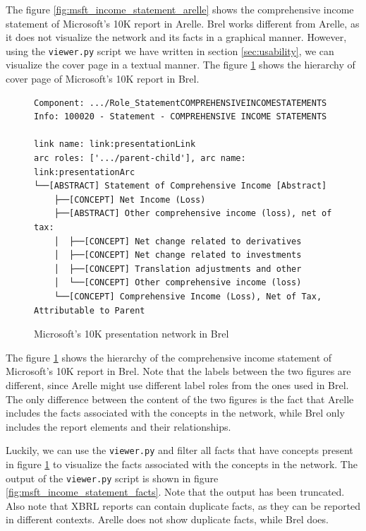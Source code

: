 The figure \ref{fig:msft_income_statement_arelle} shows the comprehensive income statement of Microsoft's 10K report in Arelle.
Brel works different from Arelle, as it does not visualize the network and its facts in a graphical manner.
However, using the \texttt{viewer.py} script we have written in section \ref{sec:usability}, 
we can visualize the cover page in a textual manner.
The figure \ref{fig:msft_income_statement_network} shows the hierarchy of cover page of Microsoft's 10K report in Brel.

\begin{figure}[H]
    \begin{lstlisting}[basicstyle=\scriptsize\ttfamily]
Component: .../Role_StatementCOMPREHENSIVEINCOMESTATEMENTS
Info: 100020 - Statement - COMPREHENSIVE INCOME STATEMENTS

link name: link:presentationLink
arc roles: ['.../parent-child'], arc name: link:presentationArc
└──[ABSTRACT] Statement of Comprehensive Income [Abstract]
    ├──[CONCEPT] Net Income (Loss)
    ├──[ABSTRACT] Other comprehensive income (loss), net of tax:
    │  ├──[CONCEPT] Net change related to derivatives
    │  ├──[CONCEPT] Net change related to investments
    │  ├──[CONCEPT] Translation adjustments and other
    │  └──[CONCEPT] Other comprehensive income (loss)
    └──[CONCEPT] Comprehensive Income (Loss), Net of Tax, Attributable to Parent
    \end{lstlisting}
    \caption{Microsoft's 10K presentation network in Brel}
    \label{fig:msft_income_statement_network}
\end{figure}

The figure \ref{fig:msft_income_statement_network} shows the hierarchy of the comprehensive income statement of Microsoft's 10K report in Brel.
Note that the labels between the two figures are different, since Arelle might use different label roles from the ones used in Brel.
The only difference between the content of the two figures is the fact that Arelle includes the facts associated with the concepts in the network, 
while Brel only includes the report elements and their relationships.

Luckily, we can use the \texttt{viewer.py} and filter all facts that have concepts present in figure \ref{fig:msft_income_statement_network}
to visualize the facts associated with the concepts in the network.
The output of the \texttt{viewer.py} script is shown in figure \ref{fig:msft_income_statement_facts}.
Note that the output has been truncated.
Also note that XBRL reports can contain duplicate facts, as they can be reported in different contexts.
Arelle does not show duplicate facts, while Brel does.

